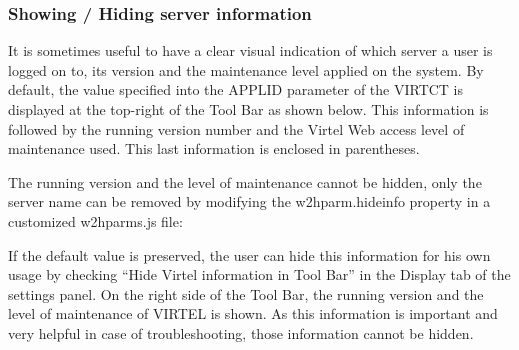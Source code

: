 \documentclass[letterpaper,10pt,english]{sphinxmanual}
\begin{document}


\ignorespaces 

\subsubsection{Showing / Hiding server information}
\label{\detokenize{Customization:showing-hiding-server-information}}\label{\detokenize{Customization:index-38}}
It is sometimes useful to have a clear visual indication of which server a user is logged on to, its version and the maintenance level applied on the system. By default, the value specified into the APPLID parameter of the VIRTCT is displayed at the top-right of the Tool Bar as shown below. This information is followed by the running version number and the Virtel Web access level of maintenance used. This last information is enclosed in parentheses.


The running version and the level of maintenance cannot be hidden, only the server name can be  removed by modifying the w2hparm.hideinfo property in a customized w2hparms.js file:

\begin{sphinxVerbatim}[commandchars=\\\{\}]
       
  
\end{sphinxVerbatim}


If the default value is preserved, the user can hide this information for his own usage by checking “Hide Virtel information in Tool Bar” in the Display tab of the settings panel. On the right side of the Tool Bar, the running version and the level of maintenance of VIRTEL is shown. As this information is important and very helpful in case of troubleshooting, those information cannot be hidden.
\end{document}
